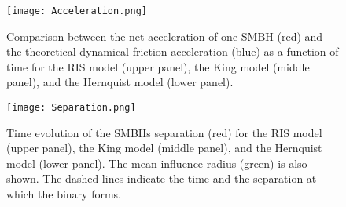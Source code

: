 \documentclass[fleqn,usenatbib]{mnras}
\begin{document}
\begin{figure}\centering
	\texttt{[image: Acceleration.png]}
    \caption{Comparison between the net acceleration of one SMBH (red) and the theoretical dynamical friction acceleration (blue) as a function of time for the RIS model (upper panel), the King model (middle panel), and the Hernquist model (lower panel).}
    \label{fig:Acceleration}
\end{figure}

\begin{figure}\centering
	\texttt{[image: Separation.png]}
    \caption{Time evolution of the SMBHs separation (red) for the RIS model (upper panel), the King model (middle panel), and the Hernquist model (lower panel). The mean influence radius (green) is also shown. The dashed lines indicate the time and the separation at which the binary forms.}
    \label{fig:Separation}
\end{figure}


\label{lastpage}
\end{document}

